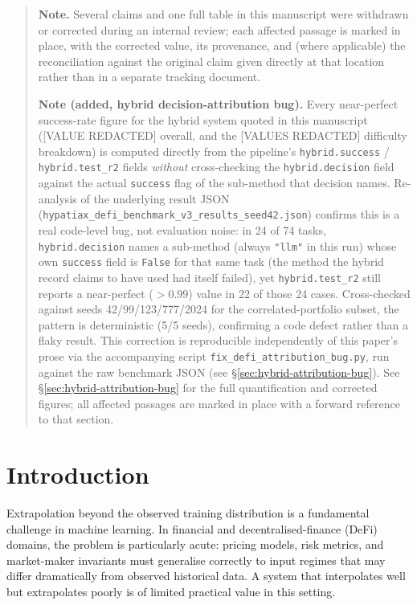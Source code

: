 \documentclass[twoside,11pt]{article}
\begin{document}
\begin{quote}\small
\textbf{Note.} Several claims and one full table in this manuscript were
withdrawn or corrected during an internal review; each affected passage is
marked in place, with the corrected value, its provenance, and (where
applicable) the reconciliation against the original claim given directly
at that location rather than in a separate tracking document.

\medskip
\noindent\textbf{Note (added, hybrid decision-attribution bug).} Every
near-perfect success-rate figure for the hybrid system quoted in this
manuscript ([VALUE REDACTED] overall, and the [VALUES REDACTED] difficulty
breakdown) is computed directly from the pipeline's \texttt{hybrid.success}
/ \texttt{hybrid.test\_r2} fields \emph{without} cross-checking the
\texttt{hybrid.decision} field against the actual \texttt{success} flag of
the sub-method that decision names. Re-analysis of the underlying result
JSON (\texttt{hypatiax\_defi\_benchmark\_v3\_results\_seed42.json}) confirms
this is a real code-level bug, not evaluation noise: in 24 of 74 tasks,
\texttt{hybrid.decision} names a sub-method (always \texttt{"llm"} in this
run) whose own \texttt{success} field is \texttt{False} for that same task
(the method the hybrid record claims to have used had itself failed), yet
\texttt{hybrid.test\_r2} still reports a near-perfect ($>0.99$) value in 22
of those 24 cases. Cross-checked against seeds
42/99/123/777/2024 for the correlated-portfolio subset, the pattern is
deterministic (5/5 seeds), confirming a code defect rather than a flaky
result. This correction is reproducible independently of this paper's prose
via the accompanying script \texttt{fix\_defi\_attribution\_bug.py}, run
against the raw benchmark JSON (see \S\ref{sec:hybrid-attribution-bug}).
See \S\ref{sec:hybrid-attribution-bug} for the full quantification
and corrected figures; all affected passages are marked in place with a
forward reference to that section.
\end{quote}


\tableofcontents
\newpage

\section{Introduction}
\label{sec:intro}

Extrapolation beyond the observed training distribution is a fundamental challenge
in machine learning.  In financial and decentralised-finance (DeFi) domains, the
problem is particularly acute: pricing models, risk metrics, and market-maker
invariants must generalise correctly to input regimes that may differ dramatically
from observed historical data.  A system that interpolates well but extrapolates
poorly is of limited practical value in this setting.
\end{document}
